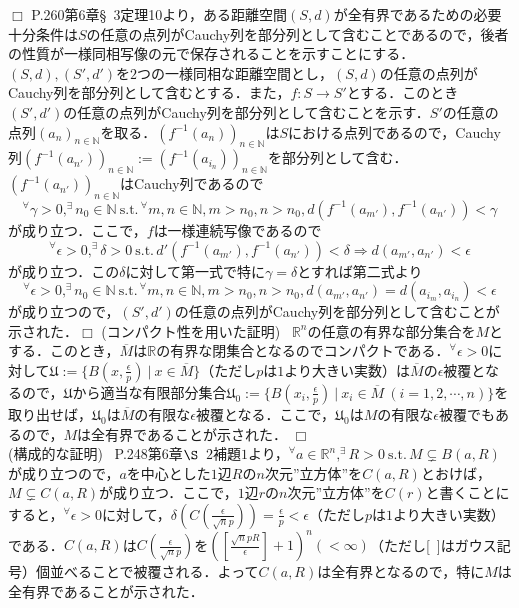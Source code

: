 ﻿\documentclass[11pt,a4paper]{jsarticle}
\newcommand{\st}{\mathrm{s.t.}\,}  %
\def\qed{\hfill $\Box$}
\begin{document}
\qed
%
\prob
P.260第6章{\S}{\ }3定理10より，ある距離空間$(S,d)$が全有界であるための必要十分条件は$S$の任意の点列がCauchy列を部分列として含むことであるので，後者の性質が一様同相写像の元で保存されることを示すことにする．$(S,d),(S',d')$を$2$つの一様同相な距離空間とし，$(S,d)$の任意の点列がCauchy列を部分列として含むとする．また，$f:S \to S'$とする．このとき$(S',d')$の任意の点列がCauchy列を部分列として含むことを示す．$S'$の任意の点列$(a_n)_{n \in \mathbb{N}}$を取る．$(f^{-1}(a_n))_{n \in \mathbb{N}}$は$S$における点列であるので，Cauchy列$(f^{-1}(a_{n'}))_{n \in \mathbb{N}}:=(f^{-1}(a_{i_n}))_{n \in \mathbb{N}}$を部分列として含む．$(f^{-1}(a_{n'}))_{n \in \mathbb{N}}$はCauchy列であるので
\begin{equation*}
^\forall \gamma>0, ^\exists n_0 \in \mathbb{N}{\ }\st ^\forall m,n \in \mathbb{N},m>n_0,n>n_0,d(f^{-1}(a_{m'}),f^{-1}(a_{n'}))<\gamma
\end{equation*}
が成り立つ．ここで，$f$は一様連続写像であるので
\begin{equation*}
^\forall \epsilon>0, ^\exists \delta>0{\ }\st d'(f^{-1}(a_{m'}),f^{-1}(a_{n'}))<\delta \Rightarrow d(a_{m'},a_{n'})<\epsilon
\end{equation*}
が成り立つ．この$\delta$に対して第一式で特に$\gamma=\delta$とすれば第二式より
\begin{equation*}
^\forall \epsilon>0, ^\exists n_0 \in \mathbb{N}{\ }\st ^\forall m,n \in \mathbb{N},m>n_0,n>n_0,d(a_{m'},a_{n'})=d(a_{i_m},a_{i_n})<\epsilon
\end{equation*}
が成り立つので，$(S',d')$の任意の点列がCauchy列を部分列として含むことが示された．\qed
%
\prob
(コンパクト性を用いた証明){\ }
$\mathbb{R}^n$の任意の有界な部分集合を$M$とする．このとき，$\overline{M}$は$\mathbb{R}$の有界な閉集合となるのでコンパクトである．$^\forall\epsilon>0$に対して$\mathfrak{U}:=\{B(x,\frac{\epsilon}{p}){\ }|{\ }x \in \overline{M}\}$（ただし$p$は$1$より大きい実数）は$\overline{M}$の$\epsilon$被覆となるので，$\mathfrak{U}$から適当な有限部分集合$\mathfrak{U}_0:=\{B(x_i,\frac{\epsilon}{p}){\ }|{\ }x_i \in \overline{M}{\ }(i=1,2,\cdots,n)\}$を取り出せば，$\mathfrak{U}_0$は$\overline{M}$の有限な$\epsilon$被覆となる．ここで，$\mathfrak{U}_0$は$M$の有限な$\epsilon$被覆でもあるので，$M$は全有界であることが示された．
\qed\\
(構成的な証明){\ }
P.248第$6$章$\S${\ }$2$補題$1$より，$^\forall a \in \mathbb{R}^n, ^\exists R>0{\ }\st M \subsetneq B(a,R)$が成り立つので，$a$を中心とした$1$辺$R$の$n$次元”立方体”を$C(a,R)$とおけば，$M \subsetneq C(a,R)$が成り立つ．ここで，$1$辺$r$の$n$次元”立方体”を$C(r)$と書くことにすると，$^\forall\epsilon>0$に対して，$\delta(C(\frac{\epsilon}{\sqrt{n}p}))=\frac{\epsilon}{p}<\epsilon$（ただし$p$は$1$より大きい実数）である．$C(a,R)$は$C(\frac{\epsilon}{\sqrt{n}p})$を$\left( \left[ \frac{\sqrt{n}pR}{\epsilon} \right]+1 \right) ^n(<\infty)$（ただし[{\ }]はガウス記号）個並べることで被覆される．よって$C(a,R)$は全有界となるので，特に$M$は全有界であることが示された．
\end{document}
